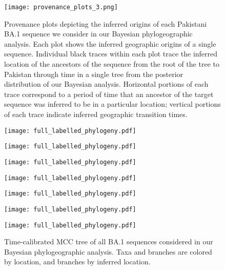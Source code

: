 \begin{figure}[!htbp]%
    \centering
    \texttt{[image: provenance\_plots\_3.png]}
    \caption[provenance plot 4]{Provenance plots depicting the inferred origins of each Pakistani BA.1 sequence we consider in our Bayesian phylogeographic analysis. Each plot shows the inferred geographic origins of a single sequence. Individual black traces within each plot trace the inferred location of the ancestors of the sequence from the root of the tree to Pakistan through time in a single tree from the posterior distribution of our Bayesian analysis. Horizontal portions of each trace correspond to a period of time that an ancestor of the target sequence was inferred to be in a particular location; vertical portions of each trace indicate inferred geographic transition times.}
    \label{sfig:prov3}
\end{figure}

\newpage
\begin{figure}[!ht]%
    \centering
    \texttt{[image: full\_labelled\_phylogeny.pdf]}
\end{figure}
\newpage
\begin{figure}[!ht]%
    \centering
    \texttt{[image: full\_labelled\_phylogeny.pdf]}
\end{figure}
\newpage
\begin{figure}[!ht]%
    \centering
    \texttt{[image: full\_labelled\_phylogeny.pdf]}
\end{figure}
\newpage
\begin{figure}[!ht]%
    \centering
    \texttt{[image: full\_labelled\_phylogeny.pdf]}
\end{figure}
\newpage
\begin{figure}[!ht]%
    \centering
    \texttt{[image: full\_labelled\_phylogeny.pdf]}
\end{figure}
\newpage
\begin{figure}[!ht]%
    \centering
    \texttt{[image: full\_labelled\_phylogeny.pdf]}
\end{figure}
\newpage
\begin{figure}[!ht]%
    \centering
    \texttt{[image: full\_labelled\_phylogeny.pdf]}
    \caption{Time-calibrated MCC tree of all BA.1 sequences considered in our Bayesian phylogeographic analysis. Taxa and branches are colored by location, and branches by inferred location.}
\end{figure}

\cleardoublepage

